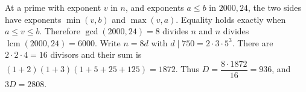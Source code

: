 At a prime with exponent $v$ in $n$, and exponents $a\le b$ in $2000,24$, the two sides have exponents $\min(v,b)$ and $\max(v,a)$. Equality holds exactly when $a\le v\le b$. Therefore $\gcd(2000,24)=8$ divides $n$ and $n$ divides $\operatorname{lcm}(2000,24)=6000$. Write $n=8d$ with $d\mid750=2\cdot3\cdot5^3$. There are $2\cdot2\cdot4=16$ divisors and their sum is $(1+2)(1+3)(1+5+25+125)=1872$. Thus $D=\dfrac{8\cdot1872}{16}=936$, and $\boxed{3D=2808}$.
